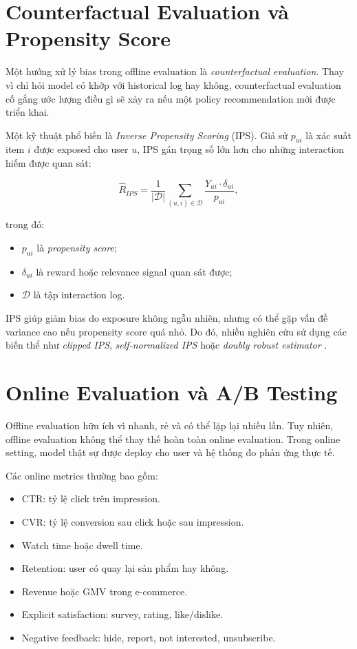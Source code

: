 \documentclass[12pt,a4paper]{article}
\begin{document}
\section{Counterfactual Evaluation và Propensity Score}

Một hướng xử lý bias trong offline evaluation là \textit{counterfactual evaluation}. Thay vì chỉ hỏi model có khớp với historical log hay không, counterfactual evaluation cố gắng ước lượng điều gì sẽ xảy ra nếu một policy recommendation mới được triển khai.

Một kỹ thuật phổ biến là \textit{Inverse Propensity Scoring} (IPS). Giả sử $p_{ui}$ là xác suất item $i$ được exposed cho user $u$, IPS gán trọng số lớn hơn cho những interaction hiếm được quan sát:

\begin{equation}
\hat{R}_{IPS} = \frac{1}{|\mathcal{D}|} \sum_{(u,i) \in \mathcal{D}} \frac{Y_{ui} \cdot \delta_{ui}}{p_{ui}},
\end{equation}

trong đó:

\begin{itemize}[leftmargin=*]
    \item $p_{ui}$ là \textit{propensity score};
    \item $\delta_{ui}$ là reward hoặc relevance signal quan sát được;
    \item $\mathcal{D}$ là tập interaction log.
\end{itemize}

IPS giúp giảm bias do exposure không ngẫu nhiên, nhưng có thể gặp vấn đề variance cao nếu propensity score quá nhỏ. Do đó, nhiều nghiên cứu sử dụng các biến thể như \textit{clipped IPS}, \textit{self-normalized IPS} hoặc \textit{doubly robust estimator} \cite{saito2020unbiased,liang2016modeling}.

\section{Online Evaluation và A/B Testing}

Offline evaluation hữu ích vì nhanh, rẻ và có thể lặp lại nhiều lần. Tuy nhiên, offline evaluation không thể thay thế hoàn toàn online evaluation. Trong online setting, model thật sự được deploy cho user và hệ thống đo phản ứng thực tế.

Các online metrics thường bao gồm:

\begin{itemize}[leftmargin=*]
    \item CTR: tỷ lệ click trên impression.
    \item CVR: tỷ lệ conversion sau click hoặc sau impression.
    \item Watch time hoặc dwell time.
    \item Retention: user có quay lại sản phẩm hay không.
    \item Revenue hoặc GMV trong e-commerce.
    \item Explicit satisfaction: survey, rating, like/dislike.
    \item Negative feedback: hide, report, not interested, unsubscribe.
\end{itemize}
\end{document}
